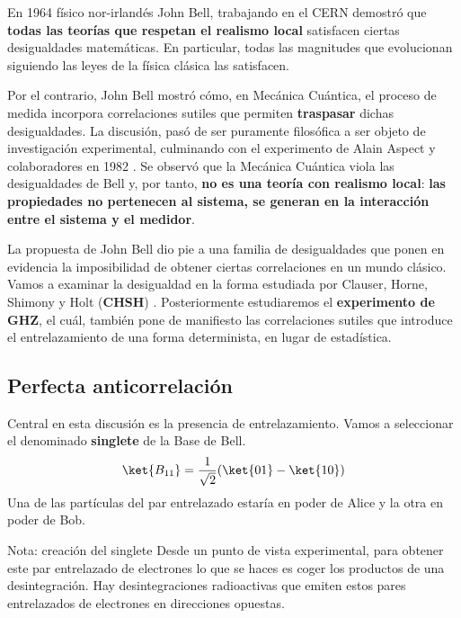 \documentclass[a4paper,11pt]{book} %
\numberwithin{equation}{chapter}
\begin{document}
En 1964  físico nor-irlandés John Bell, trabajando en el CERN demostró \cite{Bell} que \textbf{todas las teorías que respetan el realismo local} satisfacen ciertas desigualdades matemáticas. En particular, todas las magnitudes que evolucionan siguiendo las leyes de la física clásica las satisfacen.

Por el contrario, John Bell mostró cómo, en Mecánica Cuántica, el proceso de medida incorpora correlaciones sutiles que permiten \textbf{traspasar} dichas desigualdades. La discusión, pasó de ser puramente filosófica a ser objeto de investigación experimental, culminando con el  experimento de Alain Aspect y colaboradores en 1982 \cite{Bell_experiment}. Se observó que la Mecánica Cuántica viola las desigualdades de Bell y, por tanto, \textbf{no es una teoría con realismo local}: \textbf{las propiedades no pertenecen al sistema, se generan en la interacción entre el sistema y el medidor}.

La propuesta de John Bell dio pie a una familia de desigualdades que ponen en evidencia la imposibilidad de obtener ciertas correlaciones en un mundo clásico. Vamos a examinar la desigualdad en la forma estudiada por Clauser, Horne, Shimony y Holt (\textbf{CHSH}) \cite{Bell_CHSH}. Posteriormente estudiaremos el \textbf{experimento de GHZ}, el cuál, también pone de manifiesto las correlaciones sutiles que introduce el entrelazamiento de una forma determinista, en lugar de estadística.

    
        \subsection{Perfecta anticorrelación}

Central en esta discusión es la presencia de entrelazamiento. Vamos a seleccionar el denominado \textbf{singlete} de la Base de Bell. 
	\begin{equation}
	\ket{B_{11}}=\frac{1}{\sqrt{2}}(\ket{01}-\ket{10})
	\end{equation}
Una de las partículas del par entrelazado estaría en poder de Alice y la otra en poder de Bob. 

	\begin{mybox_blue}{Nota: creación del singlete}
	Desde un punto de vista experimental, para obtener este par entrelazado de electrones lo que se haces es coger los productos
	de una desintegración. Hay desintegraciones radioactivas que emiten estos pares entrelazados de electrones en direcciones 
	opuestas. 	
	\end{mybox_blue}
\end{document}
